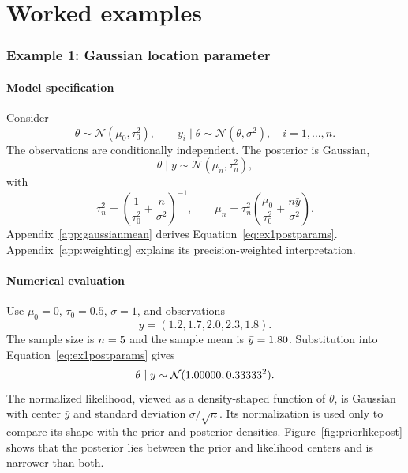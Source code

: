 \documentclass[11pt,a4paper]{article}
\begin{document}
\part{Worked examples}

\section{Example 1: Gaussian location parameter}
\subsection{Model specification}
Consider
\begin{equation}
 \theta\sim\mathcal N(\mu_0,\tau_0^2),
 \qquad
 y_i\mid\theta\sim\mathcal N(\theta,\sigma^2),
 \quad i=1,\ldots,n.
 \label{eq:ex1model}
\end{equation}
The observations are conditionally independent. The posterior is Gaussian,
\begin{equation}
 \theta\mid y\sim\mathcal N(\mu_n,\tau_n^2),
 \label{eq:ex1postdist}
\end{equation}
with
\begin{equation}
 \tau_n^2=\left(\frac{1}{\tau_0^2}+\frac{n}{\sigma^2}\right)^{-1},
 \qquad
 \mu_n=\tau_n^2\left(\frac{\mu_0}{\tau_0^2}+\frac{n\bar y}{\sigma^2}\right).
 \label{eq:ex1postparams}
\end{equation}
Appendix~\ref{app:gaussianmean} derives Equation~\eqref{eq:ex1postparams}. Appendix~\ref{app:weighting} explains its precision-weighted interpretation.

\subsection{Numerical evaluation}
Use \(\mu_0=0\), \(\tau_0=0.5\), \(\sigma=1\), and observations
\begin{equation}
 y=(1.2,1.7,2.0,2.3,1.8).
\end{equation}
The sample size is \(n=5\) and the sample mean is \(\bar y=1.80\). Substitution into Equation~\eqref{eq:ex1postparams} gives
\begin{equation}
 \theta\mid y\sim\mathcal N(1.00000,0.33333^2).
 \label{eq:ex1numericpost}
\end{equation}
The normalized likelihood, viewed as a density-shaped function of \(\theta\), is Gaussian with center \(\bar y\) and standard deviation \(\sigma/\sqrt n\). Its normalization is used only to compare its shape with the prior and posterior densities. Figure~\ref{fig:priorlikepost} shows that the posterior lies between the prior and likelihood centers and is narrower than both.
\end{document}
